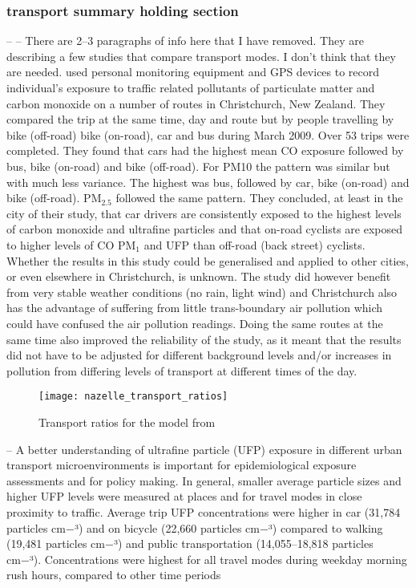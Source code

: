 
\subsubsection{transport summary holding section}
\label{transport_summary_holding}

-- -- There are 2--3 paragraphs of info here that I have removed. They are describing a few studies that compare transport modes. I don't think that they are needed.
\cite{Kingham2013} used personal monitoring equipment and GPS devices to record individual’s exposure to traffic related pollutants of particulate matter and carbon monoxide on a number of routes in Christchurch, New Zealand. They compared the trip at the same time, day and route but by people travelling by bike (off-road) bike (on-road), car and bus during March 2009. Over 53 trips were completed. They found that cars had the highest mean CO exposure followed by bus, bike (on-road) and bike (off-road). For PM10 the pattern was similar but with much less variance. The highest was bus, followed by car, bike (on-road) and bike (off-road). PM$_{2.5}$ followed the same pattern. They concluded, at least in the city of their study, that car drivers are consistently exposed to the highest levels of carbon monoxide and ultrafine particles and that on-road cyclists are exposed to higher levels of CO PM$_{1}$ and UFP than off-road (back street) cyclists. Whether the results in this study could be generalised and applied to other cities, or even elsewhere in Christchurch, is unknown. The study did however benefit from very stable weather conditions (no rain, light wind) and Christchurch also has the advantage of suffering from little trans-boundary air pollution which could have confused the air pollution readings. Doing the same routes at the same time also improved the reliability of the study, as it meant that the results did not have to be adjusted for different background levels and/or increases in pollution from differing levels of transport at different times of the day.

\begin{figure}[H]
\centering
\texttt{[image: nazelle\_transport\_ratios]}
\caption{Transport ratios for the model from \cite{DeNazelle2013}}
\label{fig:nazelle_transport_ratios}
\end{figure}

\cite{Rojas-Rueda2013} -- A better understanding of ultrafine particle (UFP) exposure in different urban transport microenvironments is important for epidemiological exposure assessments and for policy making.
In general, smaller average particle sizes and higher UFP levels were measured at places and for travel modes in close proximity to traffic. Average trip UFP concentrations were higher in car (31,784 particles cm−³) and on bicycle (22,660 particles cm−³) compared to walking (19,481 particles cm−³) and public transportation (14,055–18,818 particles cm−³). Concentrations were highest for all travel modes during weekday morning rush hours, compared to other time periods